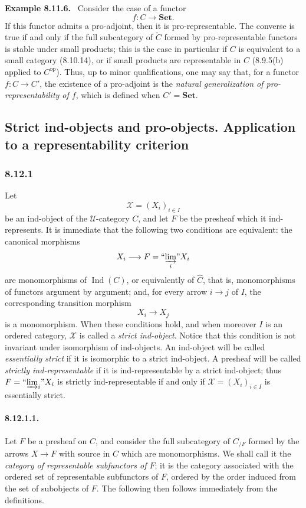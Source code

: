 \documentclass[11pt]{article}
\newcommand{\U}{\mathcal{U}}
\newcommand{\Set}{\mathbf{Set}}
\newcommand{\Ind}{\operatorname{Ind}}
\newcommand{\op}{\mathrm{op}}
\newcommand{\indlimI}[1]{\textrm{``}\!\varinjlim_{#1}\!\textrm{''}}
\newenvironment{statement}[1]{\par\medskip\noindent\textbf{#1.}\ }{\par\medskip}
\begin{document}
\begin{statement}{Example 8.11.6}
Consider the case of a functor
\[
 f:C\longrightarrow \Set.
\]
If this functor admits a pro-adjoint, then it is pro-representable. The converse is true if and only if the full subcategory of $\check C$ formed by pro-representable functors is stable under small products; this is the case in particular if $C$ is equivalent to a small category (8.10.14), or if small products are representable in $C$ (8.9.5(b) applied to $C^\op$). Thus, up to minor qualifications, one may say that, for a functor $f:C\to C'$, the existence of a pro-adjoint is the \emph{natural generalization of pro-representability of $f$}, which is defined when $C'=\Set$.
\end{statement}

\subsection{Strict ind-objects and pro-objects. Application to a representability criterion}

\subsubsection*{8.12.1}
Let
\[
 \mathcal X=(X_i)_{i\in I}
\]
be an ind-object of the $\U$-category $C$, and let $F$ be the presheaf which it ind-represents. It is immediate that the following two conditions are equivalent: the canonical morphisms
\[
 X_i\longrightarrow F=\indlimI{i}X_i
\]
are monomorphisms of $\Ind(C)$, or equivalently of $\widehat C$, that is, monomorphisms of functors argument by argument; and, for every arrow $i\to j$ of $I$, the corresponding transition morphism
\[
 X_i\longrightarrow X_j
\]
is a monomorphism. When these conditions hold, and when moreover $I$ is an ordered category, $\mathcal X$ is called a \emph{strict ind-object}. Notice that this condition is not invariant under isomorphism of ind-objects. An ind-object will be called \emph{essentially strict} if it is isomorphic to a strict ind-object. A presheaf will be called \emph{strictly ind-representable} if it is ind-representable by a strict ind-object; thus $F=\indlimI{i}X_i$ is strictly ind-representable if and only if $\mathcal X=(X_i)_{i\in I}$ is essentially strict.

\paragraph{8.12.1.1.}
Let $F$ be a presheaf on $C$, and consider the full subcategory of $C_{/F}$ formed by the arrows $X\to F$ with source in $C$ which are monomorphisms. We shall call it the \emph{category of representable subfunctors of $F$}; it is the category associated with the ordered set of representable subfunctors of $F$, ordered by the order induced from the set of subobjects of $F$. The following then follows immediately from the definitions.
\end{document}
